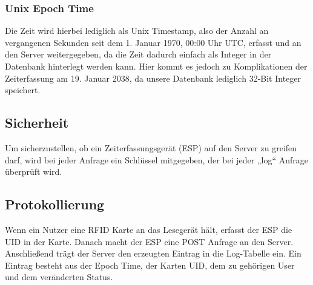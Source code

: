 \documentclass[../main.tex]{subfiles}
\begin{document}
\subsubsection{Unix Epoch Time} 
Die Zeit wird hierbei lediglich als Unix Timestamp, also der Anzahl an vergangenen Sekunden seit dem 1. Januar 1970, 00:00 Uhr UTC, erfasst und an den Server weitergegeben, da die Zeit dadurch einfach als Integer in der Datenbank hinterlegt werden kann. Hier kommt es jedoch zu Komplikationen der Zeiterfassung am 19. Januar 2038, da unsere Datenbank lediglich 32-Bit Integer speichert.


\subsection{Sicherheit}

Um sicherzustellen, ob ein Zeiterfassungsgerät (ESP) auf den Server zu greifen darf, wird bei jeder Anfrage ein Schlüssel mitgegeben, der bei jeder „log“ Anfrage überprüft wird.

\subsection{Protokollierung}

Wenn ein Nutzer eine RFID Karte an das Lesegerät hält, erfasst der ESP die UID in der Karte. Danach macht der ESP eine POST Anfrage an den Server. Anschließend trägt der Server den erzeugten Eintrag in die Log-Tabelle ein. Ein Eintrag besteht aus der Epoch Time, der Karten UID, dem zu gehörigen User und dem veränderten Status.
\end{document}
